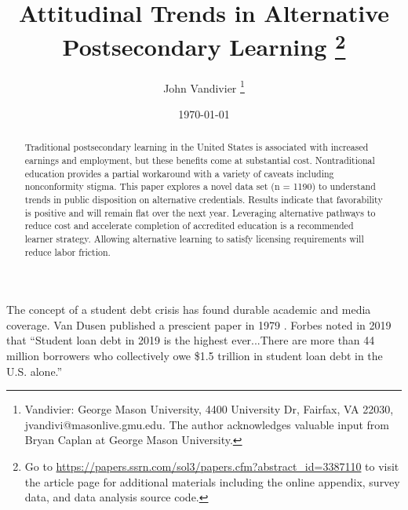 \documentclass[AER]{./aea-latex-templates/AEA}
\begin{document}
        
        \title{Attitudinal Trends in Alternative Postsecondary Learning
            \thanks{Go to \url{https://papers.ssrn.com/sol3/papers.cfm?abstract_id=3387110} to visit the article page for additional materials including the online appendix, survey data, and data analysis source code.}}
        \author{John Vandivier
            \thanks{Vandivier: George Mason University, 4400 University Dr, Fairfax, VA 22030, jvandivi@masonlive.gmu.edu. The author acknowledges valuable input from Bryan Caplan at George Mason University.}}
        \date{\today}

        \begin{abstract}
        Traditional postsecondary learning in the United States is associated
        with increased earnings and employment, but these benefits come at
        substantial cost. Nontraditional education provides a partial workaround
        with a variety of caveats including nonconformity stigma. This paper
        explores a novel data set (n = 1190) to understand trends in public
        disposition on alternative credentials. Results indicate that
        favorability is positive and will remain flat over the next year.
        Leveraging alternative pathways to reduce cost and accelerate
        completion of accredited education is a recommended learner strategy.
        Allowing alternative learning to satisfy licensing requirements
        will reduce labor friction.
        \end{abstract}

        \maketitle

        The concept of a student debt crisis has found durable academic and media
        coverage. Van Dusen published a prescient paper in 1979 \cite{van1979coming}.
        Forbes noted in 2019\cite{friedman2018student} that “Student loan
        debt in 2019 is the highest ever...There are more than 44 million borrowers
        who collectively owe \$1.5 trillion in student loan debt in the U.S.
        alone.”
\end{document}
